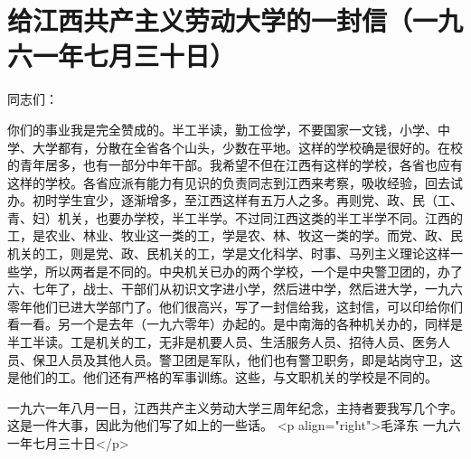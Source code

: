 \section{给江西共产主义劳动大学的一封信（一九六一年七月三十日）}


同志们：

你们的事业我是完全赞成的。半工半读，勤工俭学，不要国家一文钱，小学、中学、大学都有，分散在全省各个山头，少数在平地。这样的学校确是很好的。在校的青年居多，也有一部分中年干部。我希望不但在江西有这样的学校，各省也应有这样的学校。各省应派有能力有见识的负责同志到江西来考察，吸收经验，回去试办。初时学生宜少，逐渐增多，至江西这样有五万人之多。再则党、政、民（工、青、妇）机关，也要办学校，半工半学。不过同江西这类的半工半学不同。江西的工，是农业、林业、牧业这一类的工，学是农、林、牧这一类的学。而党、政、民机关的工，则是党、政、民机关的工，学是文化科学、时事、马列主义理论这样一些学，所以两者是不同的。中央机关已办的两个学校，一个是中央警卫团的，办了六、七年了，战士、干部们从初识文字进小学，然后进中学，然后进大学，一九六零年他们已进大学部门了。他们很高兴，写了一封信给我，这封信，可以印给你们看一看。另一个是去年（一九六零年）办起的。是中南海的各种机关办的，同样是半工半读。工是机关的工，无非是机要人员、生活服务人员、招待人员、医务人员、保卫人员及其他人员。警卫团是军队，他们也有警卫职务，即是站岗守卫，这是他们的工。他们还有严格的军事训练。这些，与文职机关的学校是不同的。

一九六一年八月一日，江西共产主义劳动大学三周年纪念，主持者要我写几个字。这是一件大事，因此为他们写了如上的一些话。
<p align="right">毛泽东
一九六一年七月三十日</p>


